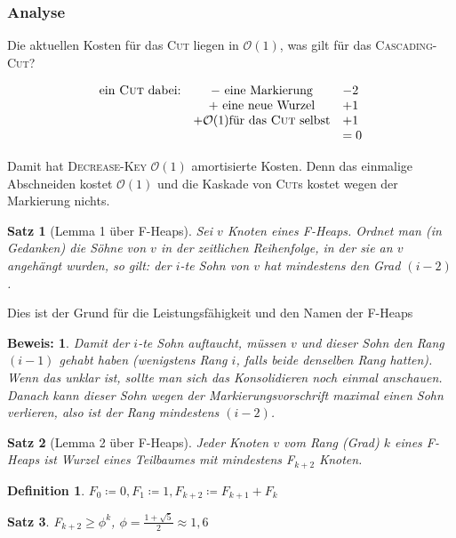 \documentclass[ngerman,draft,parskip=half*,twoside]{scrreprt}
\theoremstyle{break}
\newtheorem{satz}{Satz}[chapter]
\newtheorem{definition}{Definition}[chapter]
\theoremstyle{nonumberbreak}
\newtheorem{beweis}{Beweis:}
\newcommand*{\OO}{\mathcal{O}}      %
\begin{document}
\subsubsection{Analyse}
Die aktuellen Kosten für das \textsc{Cut} liegen in $\OO(1)$, was gilt für das \textsc{Cascading-Cut}?

\[
\begin{array}{ccl}
\mbox{ein \textsc{Cut} dabei:} & - \mbox{ eine Markierung} & -2\\
 &  + \mbox{ eine neue Wurzel} & +1\\
 &  + \OO(1) \text{für das \textsc{Cut} selbst} & +1\\
 &  & =0
\end{array}\]

Damit hat \textsc{Decrease-Key} $\OO(1)$ amortisierte Kosten. Denn das einmalige Abschneiden kostet $\OO(1)$ und die Kaskade von
\textsc{Cut}s kostet wegen der Markierung nichts. 

\begin{satz}[Lemma 1 über F-Heaps]
Sei $v$ Knoten eines F-Heaps. Ordnet man (in Gedanken) die Söhne von $v$ in der zeitlichen Reihenfolge, in der sie an
$v$ angehängt wurden, so gilt: der $i$-te Sohn von $v$ hat mindestens den Grad $(i-2)$. 
\end{satz}
Dies ist der Grund für die Leistungsfähigkeit und den Namen der F-Heaps

\begin{beweis}
Damit der $i$-te Sohn auftaucht, müssen $v$ und dieser Sohn den Rang $(i-1)$ gehabt haben (wenigstens Rang $i$, falls beide
denselben Rang hatten). Wenn das unklar ist, sollte man sich das Konsolidieren noch einmal anschauen. Danach kann dieser
Sohn wegen der Markierungsvorschrift maximal einen Sohn verlieren, also ist der Rang mindestens $(i-2)$. 
\end{beweis}

\begin{satz}[Lemma 2 über F-Heaps]
Jeder Knoten $v$ vom Rang (Grad) $k$ eines F-Heaps ist Wurzel eines Teilbaumes mit mindestens F$_{k+2}$ Knoten.
\end{satz}

\begin{definition}
$F_0\coloneqq 0, F_1\coloneqq 1, F_{k+2}\coloneqq F_{k+1} +F_{k}$
\end{definition}

\begin{satz}
F$_{k+2} \geq {\phi}^k$, $\phi=\frac{1+\sqrt{5}}{2}\approx 1,6$ 
\end{satz}
\end{document}
